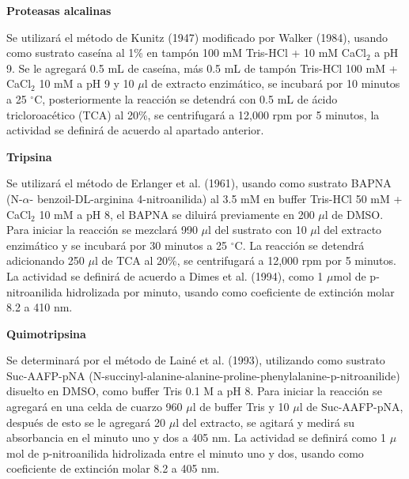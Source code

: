 \documentclass[12pt,a4paper]{article}
\begin{document}
\begin{multicols}{2}
\begin{Exercice}
\end{Exercice}

\begin{Exercice} \textbf{Proteasas alcalinas}
	
	Se utilizar\'a el método de Kunitz (1947) modificado por Walker (1984), usando como sustrato caseína al 1\% en tampón 100 mM Tris-HCl + 10 mM CaCl$_2$ a pH 9. Se le agregar\'a 0.5 mL de caseína, más 0.5 mL de tampón Tris-HCl 100 mM + CaCl$_2$ 10 mM a pH 9 y 10 $\mu$l de extracto enzimático, se incubar\'a por 10 minutos a 25 $^\circ$C, posteriormente la reacción se detendr\'a con 0.5 mL de \'acido tricloroacético (TCA) al 20\%, se centrifugar\'a a 12,000 rpm por 5 minutos, la actividad se definir\'a de acuerdo al apartado anterior.

\end{Exercice}

\begin{Exercice}\textbf{Tripsina}
	
	Se utilizar\'a el método de Erlanger et al. (1961), usando como sustrato BAPNA (N-$\alpha$- benzoil-DL-arginina 4-nitroanilida) al 3.5 mM en buffer Tris-HCl 50 mM + CaCl$_2$ 10 mM a pH 8, el BAPNA se diluir\'a previamente en 200 $\mu$l de DMSO. Para iniciar la reacción se mezclar\'a 990 $\mu$l del sustrato con 10 $\mu$l del extracto enzimático y se incubar\'a por 30 minutos a 25 $^\circ$C. La reacción se detendr\'a adicionando 250 $\mu$l de TCA al 20\%, se centrifugar\'a a 12,000 rpm por 5 minutos. La actividad se definir\'a de acuerdo a Dimes et al. (1994), como 1 $\mu$mol de p-nitroanilida hidrolizada por minuto, usando como coeficiente de extinción molar 8.2 a 410 nm.
	
\end{Exercice}

\begin{Exercice} \textbf{Quimotripsina}
	
	Se determinar\'a por el método de Lainé et al. (1993), utilizando como sustrato Suc-AAFP-pNA (N-succinyl-alanine-alanine-proline-phenylalanine-p-nitroanilide) disuelto en DMSO, como buffer Tris 0.1 M a pH 8. Para iniciar la reacción se agregar\'a en una celda de cuarzo 960 $\mu$l de buffer Tris y 10 $\mu$l de Suc-AAFP-pNA, despu\'es de esto se le agregar\'a 20 $\mu$l del extracto, se agitar\'a y medir\'a su absorbancia en el minuto uno y dos a 405 nm. La actividad se definir\'a como 1 $\mu$mol de p-nitroanilida hidrolizada entre el minuto uno y dos, usando como coeficiente de extinción molar 8.2 a 405 nm.
	

\end{Exercice}
\end{multicols}
\end{document}
